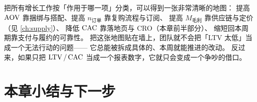 \begin{insight}
把所有增长工作按「作用于哪一项」分类，可以得到一张非常清晰的地图：
提高 $\operatorname{AOV}$ 靠捆绑与搭配、提高 $n_{\text{订单}}$ 靠复购流程与订阅、
提高 $M_{\text{毛利}}$ 靠供应链与定价（见 \cref{ch:supply}）、
降低 $\operatorname{CAC}$ 靠落地页与 CRO（本章前半部分）、
缩短回本周期靠支付与履约的可靠性。
把这张地图贴在墙上，团队就不会把「LTV 太低」当成一个无法行动的问题——
它总能被拆成具体的、本周就能推进的改动。
反过来，如果只把 $\operatorname{LTV}/\operatorname{CAC}$ 当成一个报表数字，它就只会变成一个争吵的借口。
\end{insight}

\section{本章小结与下一步}

